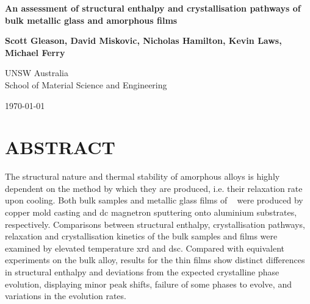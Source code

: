 \documentclass[draft,a4paper,12pt,oneside]{article}%
\begin{document}
\thispagestyle{empty} %
\begin{titlepage}
\begin{center}
\vspace*{1cm}
	
\textbf{\LARGE{An assessment of structural enthalpy and crystallisation pathways of \MgZnCa~ bulk metallic glass and amorphous films}}

\vspace{2cm}

\textbf{Scott Gleason, David Miskovic, Nicholas Hamilton, Kevin Laws, Michael Ferry}

\vspace{2cm}

UNSW Australia\\ School of Material Science and Engineering

\vspace{2cm}

\today
\end{center}
\end{titlepage}

\clearpage 
{}


\section*{ABSTRACT}

The structural nature and thermal stability of amorphous alloys is highly dependent on the method by which they are produced, i.e. their relaxation rate upon cooling.  Both bulk samples and metallic glass films of \MgZnCa~ were produced by copper mold casting and \gls{dc} magnetron sputtering onto aluminium substrates, respectively. Comparisons between structural enthalpy, crystallisation pathways, relaxation and crystallisation kinetics of the bulk samples and films were examined by elevated temperature \acrshort{xrd} and \acrshort{dsc}. Compared with equivalent experiments on the bulk alloy, results for the thin films show distinct differences in structural enthalpy and deviations from the expected crystalline phase evolution, displaying minor peak shifts, failure of some phases to evolve, and variations in the evolution rates. 

\end{document}
